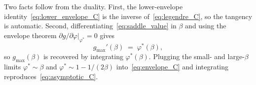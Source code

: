 \documentclass[letterpaper]{article} %
\newcommand{\Bnet}{\beta}
\newcommand{\p}{\partial}
\begin{document}
Two facts follow from the duality.  First, the lower-envelope
identity~\eqref{eq:lower_envelope_C} is the inverse
of~\eqref{eq:legendre_C}, so the tangency is automatic.  Second,
differentiating~\eqref{eq:saddle_value} in $\Bnet$ and using the
envelope theorem $\p g/\p\varphi|_{\varphi^*} = 0$ gives
\begin{equation}
g_{\max}'(\Bnet) \;=\; \varphi^*(\Bnet),
\label{eq:envelope_C}
\end{equation}
so $g_{\max}(\Bnet)$ is recovered by integrating $\varphi^*(\Bnet)$.
Plugging the small- and large-$\Bnet$ limits $\varphi^* \sim \Bnet$
and $\varphi^* \sim 1 - 1/(2\Bnet)$ into~\eqref{eq:envelope_C} and
integrating reproduces~\eqref{eq:asymptotic_C}.
\end{document}
